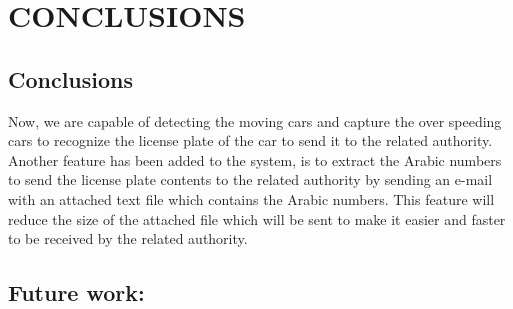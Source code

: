 \chapter{CONCLUSIONS} 
\label{chapter:Conclusions}




\ifpdf
    \graphicspath{{7_Conclusions/figures/PNG/}{7_Conclusions/figures/PDF/}{7_Conclusions/figures/}}
\else
    \graphicspath{{7_Conclusions/figures/EPS/}{7_Conclusions/figures/}}
\fi


\section{Conclusions}
\noindent Now, we are capable of detecting the moving cars and capture the
over speeding cars to recognize the license plate of the car to send
it to the related authority. Another feature has been added to the
system, is to extract the Arabic numbers to send the license plate
contents to the related authority by sending an e-mail with an
attached text file which contains the Arabic numbers. This feature
will reduce the size of the attached file which will be sent to make
it easier and faster to be received by the related authority.

\section{ Future work:}
